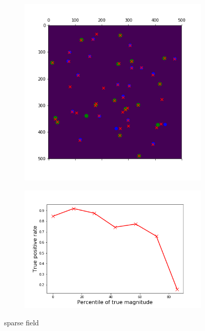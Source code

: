 \begin{figure}
    \centering
    \begin{subfigure}[!t]{0.45\textwidth}
        \includegraphics[width=\textwidth]{figures/sparse_field_detections.png}
        \label{fig:sparse_field_detect}
    \end{subfigure}
    \begin{subfigure}[!t]{0.54\textwidth}
        \includegraphics[width=\textwidth]{figures/sparse_field_tpr.png}
        \label{fig:sparse_field_tpr}
    \end{subfigure}
    \caption{sparse field}
    \label{fig:sparse_field}
\end{figure}
